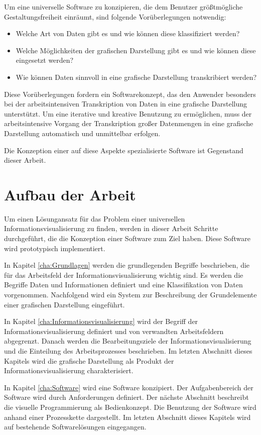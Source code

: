 \documentclass[a4paper, 
               12pt,
               DIV=calc,
               version=first,
               pdftex,
               headsepline,
               footsepline,
               bibtotocnumbered,
               liststotocnumbered]{scrreprt}
\begin{document}
Um eine universelle Software zu konzipieren, die dem Benutzer größtmögliche
Gestaltungsfreiheit einräumt, sind folgende Vorüberlegungen notwendig:
\begin{itemize}
\item{Welche Art von Daten gibt es und wie können diese klassifiziert werden?}
\item{Welche Möglichkeiten der grafischen Darstellung gibt es und wie können diese eingesetzt werden?}
\item{Wie können Daten sinnvoll in eine grafische Darstellung transkribiert werden?}
\end{itemize}
Diese Vorüberlegungen fordern ein Softwarekonzept, das den Anwender besonders bei der 
arbeitsintensiven Transkription
von Daten in eine grafische Darstellung unterstützt.
Um eine iterative und kreative Benutzung zu ermöglichen, muss der arbeitsintensive Vorgang
der Transkription großer Datenmengen in eine grafische Darstellung
automatisch und unmittelbar erfolgen.

Die Konzeption einer auf diese Aspekte spezialisierte Software ist Gegenstand dieser Arbeit.
\section{Aufbau der Arbeit}
Um einen Lösungansatz für das Problem einer universellen Informationsvisualisierung
zu finden, werden in dieser Arbeit Schritte durchgeführt, die die Konzeption einer Software zum Ziel haben.
Diese Software wird prototypisch implementiert.

In Kapitel \ref{cha:Grundlagen} werden die grundlegenden Begriffe beschrieben, die für
das Arbeitsfeld der Informationsvisualisierung wichtig sind. Es werden die Begriffe
Daten und Informationen definiert und eine Klassifikation von Daten vorgenommen.
Nachfolgend wird ein System zur Beschreibung der Grundelemente einer grafischen Darstellung
eingeführt. 

In Kapitel \ref{cha:Informationsvisualisierung} wird der Begriff der Informationsvisualisierung
definiert und von verwandten Arbeitsfeldern abgegrenzt. Danach werden die Bearbeitungsziele
der Informationsvisualisierung und die Einteilung des Arbeitsprozesses
beschrieben. Im letzten Abschnitt dieses Kapitels wird die grafische Darstellung als Produkt
der Informationsvisualisierung charakterisiert.

In Kapitel \ref{cha:Software} wird eine Software konzipiert.
Der Aufgabenbereich der Software wird durch Anforderungen definiert. Der nächste Abschnitt beschreibt
die visuelle Programmierung als Bedienkonzept. Die Benutzung der Software wird anhand einer
Prozesskette dargestellt. Im letzten Abschnitt dieses Kapitels wird auf bestehende Softwarelösungen
eingegangen.
\end{document}
